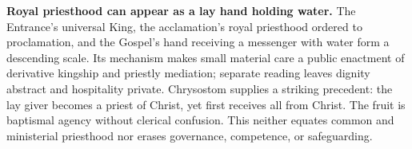 \noindent\textbf{Royal priesthood can appear as a lay hand holding water.\enspace{}}
The Entrance's universal King, the acclamation's royal priesthood ordered to proclamation, and the Gospel's hand receiving a messenger with water form a descending scale. Its mechanism makes small material care a public enactment of derivative kingship and priestly mediation; separate reading leaves dignity abstract and hospitality private. Chrysostom supplies a striking precedent: the lay giver becomes a priest of Christ, yet first receives all from Christ. The fruit is baptismal agency without clerical confusion. This neither equates common and ministerial priesthood nor erases governance, competence, or safeguarding.

